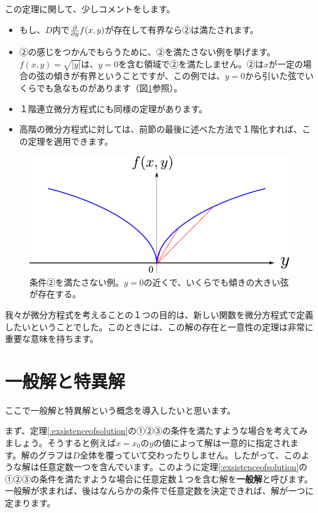 \documentclass[report,paper=a4, fontsize=12pt, line_length=16cm, number_of_lines=33,dvipdfmx]{jlreq}
\numberwithin{equation}{section}
\newcommand{\strong}[1]{\textsf{\bfseries #1}}
\begin{document}
この定理に関して、少しコメントをします。
\begin{itemize}
  \item もし、$D$内で$\pdv{y}f(x,y)$が存在して有界なら②は満たされます。
  \item ②の感じをつかんでもらうために、②を満たさない例を挙げます。$f(x,y)=\sqrt{|y|}$は、$y=0$を含む領域で②を満たしません。②は$x$が一定の場合の弦の傾きが有界ということですが、この例では、$y=0$から引いた弦でいくらでも急なものがあります（図\ref{fig:singular}参照）。
  \item １階連立微分方程式にも同様の定理があります。
  \item 高階の微分方程式に対しては、前節の最後に述べた方法で１階化すれば、この定理を適用できます。
\end{itemize}
\begin{figure}[htbp]
  \centering
  \includegraphics{singular.pdf}
  \caption{条件②を満たさない例。$y=0$の近くで、いくらでも傾きの大きい弦が存在する。}
  \label{fig:singular}
\end{figure}

我々が微分方程式を考えることの１つの目的は、新しい関数を微分方程式で定義したいということでした。このときには、この解の存在と一意性の定理は非常に重要な意味を持ちます。

\section{一般解と特異解}
ここで一般解と特異解という概念を導入したいと思います。

まず、定理\ref{:exsistenceofsolution}の①②③の条件を満たすような場合を考えてみましょう。そうすると例えば$x=x_0$の$y$の値によって解は一意的に指定されます。解のグラフは$D$全体を覆っていて交わったりしません。したがって、このような解は任意定数一つを含んでいます。このように定理\ref{:exsistenceofsolution}の①②③の条件を満たすような場合に任意定数１つを含む解を\strong{一般解}と呼びます。一般解が求まれば、後はなんらかの条件で任意定数を決定できれば、解が一つに定まります。
\end{document}
